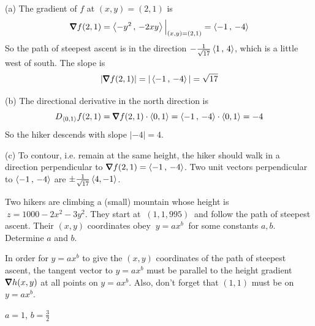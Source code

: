 \begin{solution}
(a) The gradient of $f$ at $(x,y)=(2,1)$ is
\begin{align*}
\vnabla f(2,1) = \llt -y^2\,,\,-2xy \rgt\Big|_{(x,y)=(2,1)}
               = \llt -1\,,\, -4\rgt
\end{align*}
So the path of steepest ascent is in the direction 
$-\frac{1}{\sqrt{17}}\left< 1\,,\, 4\right>$, which is a little
west of south. The slope is
\begin{equation*}
|\vnabla f(2,1)| = |\llt -1\,,\, -4\rgt| = \sqrt{17}
\end{equation*}

(b) The directional derivative in the north direction is
\begin{equation*}
D_{\llt 0,1\rgt}f(2,1) = \vnabla f(2,1)\cdot\llt 0,1\rgt
               = \llt -1\,,\, -4\rgt \cdot \llt 0,1\rgt = -4
\end{equation*}
So the hiker descends with slope $|-4|=4$.

(c) To contour, i.e. remain at the same height, the hiker should walk
in a direction perpendicular to $\vnabla f(2,1)= \llt -1\,,\, -4\rgt$.
Two unit vectors perpendicular to $\left< -1\,,\, -4\right>$
are $\pm\frac{1}{\sqrt{17}}\left< 4, -1\right>$.
\end{solution}

\begin{question}
Two hikers are climbing a (small) mountain whose height is 
$\ z=1000-2x^2-3y^2.$ 
They start at $\ (1,1,995)\ $ and follow the path of steepest ascent. Their
$(x,y)$ coordinates obey $\ y=ax^b\ $ for some constants $a, b$. 
Determine $a$ and $b$.
\end{question}

\begin{hint}
In order for $y=ax^b$ to give the $(x,y)$ coordinates of the
path of steepest ascent,  the tangent vector to $y=ax^b$ must be parallel
to the height gradient $\vnabla h(x,y)$ at all points on $y=ax^b$.
Also, don't forget that $(1,1)$ must be on $y=ax^b$.
\end{hint}

\begin{answer}
$a=1$, $b=\frac{3}{2}$
\end{answer}

